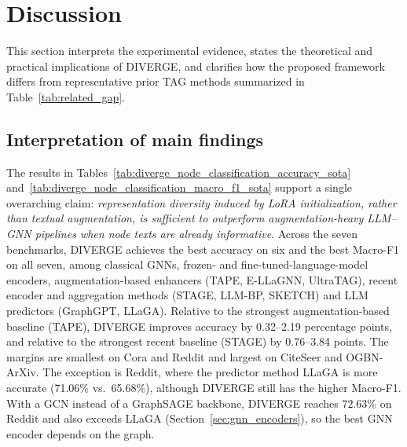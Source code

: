 \documentclass[a4paper,fleqn]{cas-sc}
\DeclareRobustCommand{\revcommon}[2][]{\textcolor{revshared}{#2}} %
\begin{document}
\section{Discussion}\label{sec:Discussion}

This section interprets the experimental evidence, states the theoretical and practical implications of DIVERGE, and clarifies how the proposed framework differs from representative prior TAG methods summarized in Table~\ref{tab:related_gap}.

\subsection{Interpretation of main findings}\label{sec:resultsAnalysis}

The results in Tables~\ref{tab:diverge_node_classification_accuracy_sota} and~\ref{tab:diverge_node_classification_macro_f1_sota} support a single overarching claim: \emph{representation diversity induced by LoRA initialization, rather than textual augmentation, is sufficient to outperform augmentation-heavy LLM--GNN pipelines when node texts are already informative}. \revcommon[R2,R4]{Across the seven benchmarks, DIVERGE achieves the best accuracy on six and the best Macro-F1 on all seven, among classical GNNs, frozen- and fine-tuned-language-model encoders, augmentation-based enhancers (TAPE, E-LLaGNN, UltraTAG), recent encoder and aggregation methods (STAGE, LLM-BP, SKETCH) and LLM predictors (GraphGPT, LLaGA). Relative to the strongest augmentation-based baseline (TAPE), DIVERGE improves accuracy by 0.32--2.19 percentage points, and relative to the strongest recent baseline (STAGE) by 0.76--3.84 points. The margins are smallest on Cora and Reddit and largest on CiteSeer and OGBN-ArXiv. The exception is Reddit, where the predictor method LLaGA is more accurate (71.06\% vs.\ 65.68\%), although DIVERGE still has the higher Macro-F1. With a GCN instead of a GraphSAGE backbone, DIVERGE reaches $72.63\%$ on Reddit and also exceeds LLaGA (Section~\ref{sec:gnn_encoders}), so the best GNN encoder depends on the graph.}
\end{document}
